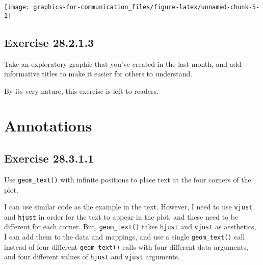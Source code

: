 \documentclass[]{book}
\theoremstyle{plain}
\theoremstyle{remark}
\begin{document}
\begin{center}\texttt{[image: graphics-for-communication\_files/figure-latex/unnamed-chunk-5-1]} \end{center}

\hypertarget{exercise-28.2.1.3}{%
\subsection*{\texorpdfstring{Exercise
{28.2.1.3}}{Exercise 28.2.1.3}}\label{exercise-28.2.1.3}}

Take an exploratory graphic that you've created in the last month, and
add informative titles to make it easier for others to understand.

By its very nature, this exercise is left to readers.

\hypertarget{annotations}{%
\section{Annotations}\label{annotations}}

\hypertarget{exercise-28.3.1.1}{%
\subsection*{\texorpdfstring{Exercise
{28.3.1.1}}{Exercise 28.3.1.1}}\label{exercise-28.3.1.1}}

Use \texttt{geom\_text()} with infinite positions to place text at the
four corners of the plot.

I can use similar code as the example in the text. However, I need to
use \texttt{vjust} and \texttt{hjust} in order for the text to appear in
the plot, and these need to be different for each corner. But,
\texttt{geom\_text()} takes \texttt{hjust} and \texttt{vjust} as
aesthetics, I can add them to the data and mappings, and use a single
\texttt{geom\_text()} call instead of four different
\texttt{geom\_text()} calls with four different data arguments, and four
different values of \texttt{hjust} and \texttt{vjust} arguments.
\end{document}
